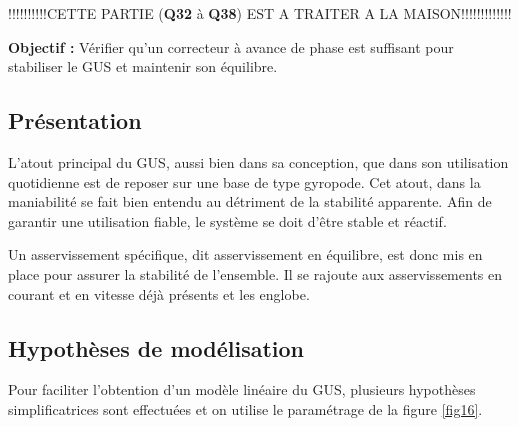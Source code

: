 !!!!!!!!!!CETTE PARTIE (\textbf{Q32} à \textbf{Q38}) EST A TRAITER A LA MAISON!!!!!!!!!!!!!

\textbf{Objectif :} Vérifier qu'un correcteur à avance de phase est suffisant pour stabiliser le GUS et
maintenir son équilibre.

\subsection{Présentation}

L'atout principal du GUS, aussi bien dans sa conception, que dans son utilisation quotidienne est
de reposer sur une base de type gyropode. Cet atout, dans la maniabilité se fait bien entendu au
détriment de la stabilité apparente. Afin de garantir une utilisation fiable, le système se doit d'être
stable et réactif.

Un asservissement spécifique, dit asservissement en équilibre, est donc mis en place pour
assurer la stabilité de l'ensemble. Il se rajoute aux asservissements en courant et en vitesse déjà
présents et les englobe.

\subsection{Hypothèses de modélisation}

Pour faciliter l'obtention d'un modèle linéaire du GUS, plusieurs hypothèses simplificatrices sont effectuées et on utilise le paramétrage de la figure \ref{fig16}.

